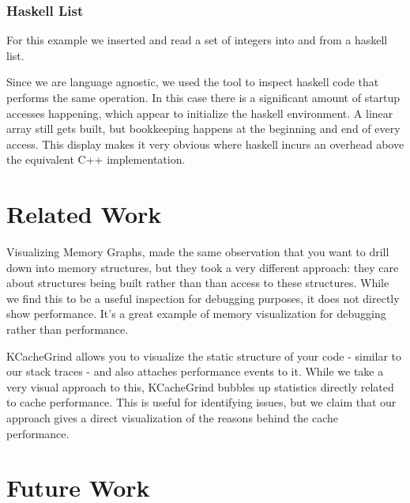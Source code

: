 \documentclass[annual]{acmsiggraph}
\begin{document}
  \subsubsection{Haskell List}
  For this example we inserted and read a set of integers into and from a haskell list.
  
  Since we are language agnostic, we used the tool to inspect haskell code that performs the same operation. In this case there is a significant amount of startup accesses happening, which appear to initialize the haskell environment. A linear array still gets built, but bookkeeping happens at the beginning and end of every access. This display makes it very obvious where haskell incurs an overhead above the equivalent C++ implementation.
  

\section{Related Work}\label{ch_r}

Visualizing Memory Graphs\cite{zimmerman:2001:VMG}, made the same observation that you want to drill down into memory structures, but they took a very different approach: they care about structures being built rather than than access to these structures. While we find this to be a useful inspection for debugging purposes, it does not directly show performance. It's a great example of memory visualization for debugging rather than performance.

KCacheGrind allows you to visualize the static structure of your code - similar to our stack traces - and also attaches performance events to it. While we take a very visual approach to this, KCacheGrind bubbles up statistics directly related to cache performance. This is useful for identifying issues, but we claim that our approach gives a direct visualization of the reasons behind the cache performance.

\section{Future Work}\label{ch_f}
\end{document}
